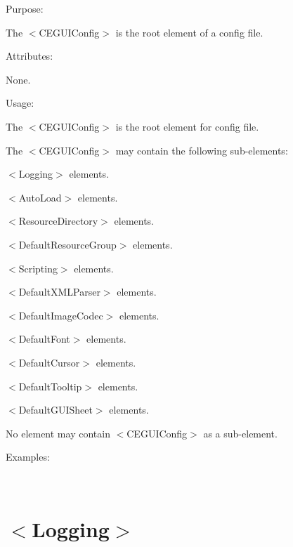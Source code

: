 \begin{DoxyItemize}
\item Purpose\+:
\begin{DoxyItemize}
\item The $<$C\+E\+G\+U\+I\+Config$>$ is the root element of a config file.
\end{DoxyItemize}
\item Attributes\+:
\begin{DoxyItemize}
\item None.
\end{DoxyItemize}
\item Usage\+:
\begin{DoxyItemize}
\item The $<$C\+E\+G\+U\+I\+Config$>$ is the root element for config file.
\item The $<$C\+E\+G\+U\+I\+Config$>$ may contain the following sub-\/elements\+:
\begin{DoxyItemize}
\item $<$Logging$>$ elements.
\item $<$Auto\+Load$>$ elements.
\item $<$Resource\+Directory$>$ elements.
\item $<$Default\+Resource\+Group$>$ elements.
\item $<$Scripting$>$ elements.
\item $<$Default\+X\+M\+L\+Parser$>$ elements.
\item $<$Default\+Image\+Codec$>$ elements.
\item $<$Default\+Font$>$ elements.
\item $<$Default\+Cursor$>$ elements.
\item $<$Default\+Tooltip$>$ elements.
\item $<$Default\+G\+U\+I\+Sheet$>$ elements.
\end{DoxyItemize}
\item No element may contain $<$C\+E\+G\+U\+I\+Config$>$ as a sub-\/element.
\end{DoxyItemize}
\item Examples\+:
\end{DoxyItemize}

~\newline
 \hypertarget{xml_config_xml_config_logging}{}\section{$<$\+Logging$>$}\label{xml_config_xml_config_logging}

